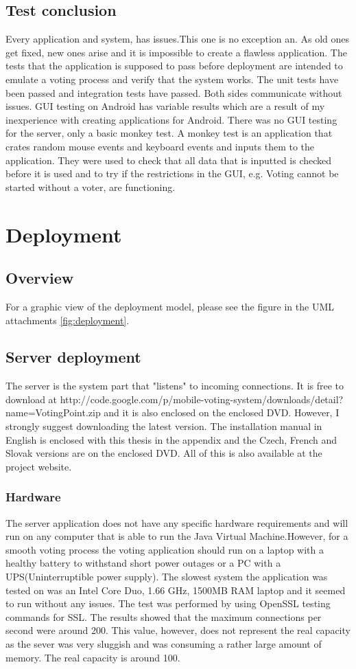 \documentclass[11pt,twoside,a4paper]{book}
\begin{document}
\section{Test conclusion}
Every application and system, has issues.This one is no exception an. As old ones get fixed, new ones arise and it is impossible to create a flawless application. The tests that the application is supposed to pass before deployment are intended to emulate a voting process and verify that the system works. The unit tests have been passed and integration tests have passed. Both sides communicate without issues. GUI testing on Android has variable results which are a result of my inexperience with creating applications for Android. There was no GUI testing for the server, only a basic monkey test. A monkey test is an application that crates random mouse events and keyboard events and inputs them to the application. They were used to check that all data that is inputted is checked before it is used and to try if the restrictions in the GUI, e.g. Voting cannot be started without a voter, are functioning.
 \chapter{Deployment}
\section{Overview}
For a graphic view of the deployment model, please see the figure in the UML attachments \ref{fig:deployment}.
\section{Server deployment}
The server is the system part that "listens" to incoming connections. It is free to download at http://code.google.com/p/mobile-voting-system/downloads/detail?name=VotingPoint.zip and it is also enclosed on the enclosed DVD. However, I strongly suggest downloading the latest version. The installation manual in English is enclosed with this thesis in the appendix and the Czech, French and Slovak versions are on the enclosed DVD. All of this is also available at the project website\cite{projectPage}.
\subsection{Hardware}
The server application does not have any specific hardware requirements and will run on any computer that is able to run the Java Virtual Machine.However, for a smooth voting process the voting application should run on a laptop with a healthy battery to withstand short power outages or a PC with a UPS(Uninterruptible power supply). The slowest system the application was tested on was an Intel Core Duo, 1.66 GHz, 1500MB RAM laptop and it seemed to run without any issues. The test was performed by using OpenSSL\cite{openssl} testing commands for SSL. The results showed that the maximum connections per second were around 200. This value, however, does not represent the real capacity as the sever was very sluggish and was consuming a rather large amount of memory. The real capacity is around 100.
\end{document}
